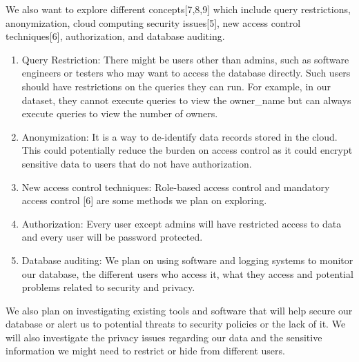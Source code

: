 \documentclass[sigconf]{acmart}
\begin{document}
We also want to explore different concepts[7,8,9] which include query restrictions, anonymization, cloud computing security issues[5], new access control techniques[6], authorization, and database auditing. 

\begin{enumerate}
    \item Query Restriction: There might be users other than admins, such as software engineers or testers who may want to access the database directly. Such users should have restrictions on the queries they can run. For example, in our dataset, they cannot execute queries to view the owner\_name but can always execute queries to view the number of owners.
    \item Anonymization: It is a way to de-identify data records stored in the cloud.  This could potentially reduce the burden on access control as it could encrypt sensitive data to users that do not have authorization.
    \item New access control techniques: Role-based access control and mandatory access control [6] are some methods we plan on exploring.
    \item Authorization: Every user except admins will have restricted access to data  and every user will be password protected.
    \item Database auditing: We plan on using software and logging systems to monitor our database, the different users who access it, what they access and potential problems related to security and privacy.
    
\end{enumerate}
We also plan on investigating existing tools and software that will help secure our database or alert us to potential threats to security policies or the lack of it.
We will also investigate the privacy issues regarding our data and the sensitive information we might need to restrict or hide from different users.
\end{document}
